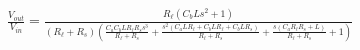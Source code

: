 $\frac{V_{out}}{V_{in}}=\frac{R_{\ell} \left(C_{b} L s^{2} + 1\right)}{\left(R_{\ell} + R_{s}\right) \left(\frac{C_{a} C_{b} L R_{\ell} R_{s} s^{3}}{R_{\ell} + R_{s}} + \frac{s^{2} \left(C_{a} L R_{\ell} + C_{b} L R_{\ell} + C_{b} L R_{s}\right)}{R_{\ell} + R_{s}} + \frac{s \left(C_{a} R_{\ell} R_{s} + L\right)}{R_{\ell} + R_{s}} + 1\right)}$ 